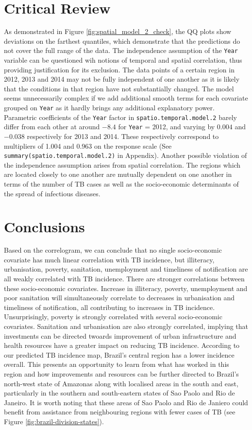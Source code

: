\section{Critical Review}

As demonstrated in Figure \ref{fig:spatial_model_2_check}, the QQ plots show deviations on the farthest quantiles, which demonstrate that the predictions do not cover the full range of the data. The independence assumption of the \texttt{Year} variable can be questioned wih notions of temporal and spatial correlation, thus providing justification for its exclusion. The data points of a certain region in 2012, 2013 and 2014 may not be fully independent of one another as it is likely that the conditions in that region have not substantially changed. The model seems unnecessarily complex if we add additional smooth terms for each covariate grouped on \texttt{Year} as it hardly brings any additional explanatory power. Parametric coefficients of the \texttt{Year} factor in \texttt{spatio.temporal.model.2} barely differ from each other at around $-8.4$ for \texttt{Year} = 2012, and varying by $0.004$ and $-0.038$ respectively for 2013 and 2014. These respectively correspond to multipliers of 1.004 and 0.963 on the response scale (See \texttt{summary(spatio.temporal.model.2)} in Appendix). Another possible violation of the independence assumption arises from spatial correlation. The regions which are located closely to one another are mutually dependent on one another in terms of the number of TB cases as well as the socio-economic determinants of the spread of infectious diseases.

\section{Conclusions}
Based on the correlogram, we can conclude that no single socio-economic covariate has much linear correlation with TB incidence, but illiteracy, urbanisation, poverty, sanitation, unemployment and timeliness of notification are all weakly correlated with TB incidence. There are stronger correlations between these socio-economic covariates. Increase in illiteracy, poverty, unemployment and poor sanitation will simultaneously correlate to decreases in urbanisation and timeliness of notification, all contributing to increases in TB incidence. Unsurprisingly, poverty is strongly correlated with several socio-economic covariates. Sanitation and urbanisation are also strongly correlated, implying that investments can be directed twoards improvement of urban infrastructure and health resources have a greater impact on reducing TB incidence. According to our predicted TB incidence map, Brazil's central region has a lower incidence overall. This presents an opportunity to learn from what has worked in this region and how improvements and resources can be further directed to Brazil's north-west state of Amazonas along with localised areas in the south and east, particularly in the southern and south-eastern states of Sao Paolo and Rio de Janeiro. It is worth noting that these areas of Sao Paolo and Rio de Janiero could benefit from assistance from neighbouring regions with fewer cases of TB (see Figure \ref{fig:brazil-division-states}).